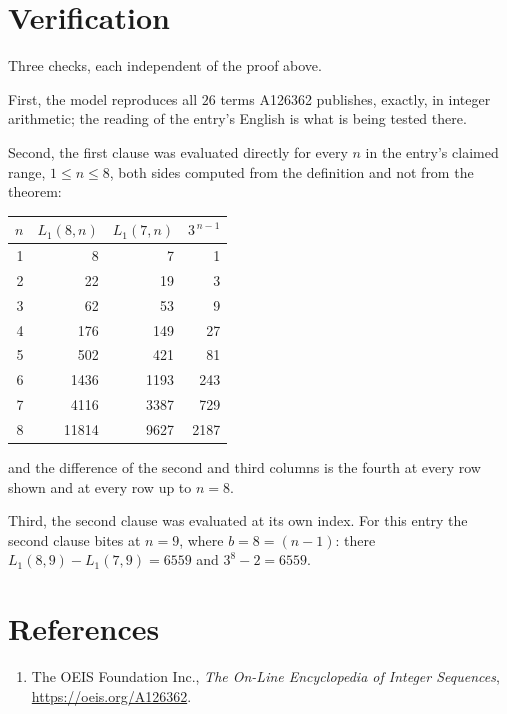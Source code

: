\documentclass[11pt,a4paper]{article}
\theoremstyle{plain}
\theoremstyle{definition}
\begin{document}
\section{Verification}

Three checks, each independent of the proof above.

First, the model reproduces all $26$ terms A126362 publishes, exactly, in integer
arithmetic; the reading of the entry's English is what is being tested there.

Second, the first clause was evaluated directly for every $n$ in the entry's claimed range,
$1\le n\le8$, both sides computed from the definition and not from the theorem:

\begin{center}
\begin{tabular}{rrrr}
$n$ & $L_{1}(8,n)$ & $L_{1}(7,n)$ & $3^{\,n-1}$ \\ \hline
1 & 8 & 7 & 1 \\
2 & 22 & 19 & 3 \\
3 & 62 & 53 & 9 \\
4 & 176 & 149 & 27 \\
5 & 502 & 421 & 81 \\
6 & 1436 & 1193 & 243 \\
7 & 4116 & 3387 & 729 \\
8 & 11814 & 9627 & 2187 \\
\end{tabular}
\end{center}

\noindent and the difference of the second and third columns is the fourth at every row shown
and at every row up to $n=8$.

Third, the second clause was evaluated at its own index. For this entry the second clause bites at $n=9$, where $b=8=(n-1)$: there $L_{1}(8,9)-L_{1}(7,9)=6559$ and $3^{8}-2=6559$.

\section*{References}
\begin{enumerate}
\item The OEIS Foundation Inc., \emph{The On-Line Encyclopedia of Integer Sequences},
\url{https://oeis.org/A126362}.
\end{enumerate}
\end{document}
